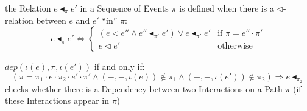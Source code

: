the Relation $e \blacktriangleleft_\pi e'$ in a Sequence of Events
$\pi$ is defined when there is a $\lhd$-relation between $e$ and $e'$
``in'' $\pi$:
\[
  e \blacktriangleleft_\pi e' \Leftrightarrow \begin{cases}
    (e \lhd e'' \wedge e'' \blacktriangleleft_{\pi'} e') \vee
      e \blacktriangleleft_{\pi'} e' & \text{if }\pi = e''\cdot\pi' \\
    e \lhd e' & \text{otherwise}
  \end{cases}
\]

$dep(\iota(e),\pi,\iota(e'))$ if and only if:
\[
  (\pi = \pi_1\cdot{e}\cdot\pi_2\cdot{e'}\cdot\pi' \wedge
    (-,-,\iota(e)) \notin \pi_1 \wedge (-,-,\iota(e'))\notin \pi_2)
  \Longrightarrow e \blacktriangleleft_{\pi_2}
\]
checks whether there is a Dependency between two Interactions on a
Path $\pi$ (if these Interactions appear in $\pi$)


